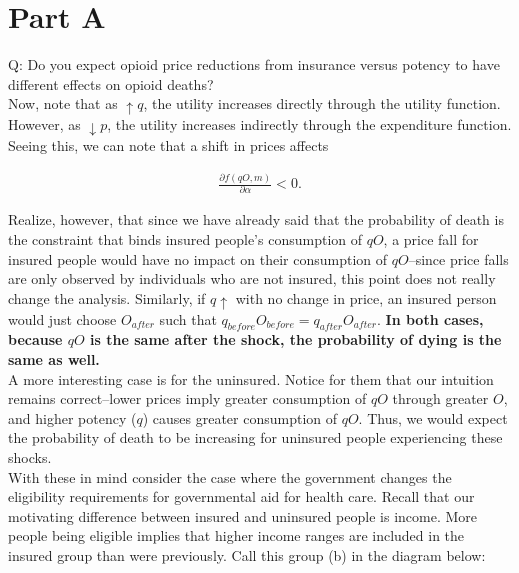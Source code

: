\documentclass{article}
\begin{document}
\section*{Part A}
Q: Do you expect opioid price reductions from insurance versus potency to have different effects on opioid deaths?
\\

Now, note that as $\uparrow q$, the utility increases directly through the  utility function. However, as $\downarrow p$, the utility increases indirectly through the expenditure function. Seeing this, we can note that a shift in prices affects \par

\begin{align*}
\frac{\partial f(qO,m)}{\partial \alpha} <0.
\end{align*}

Realize, however, that since we have already said that the probability of death is the constraint that binds insured people's consumption of $qO$, a price fall for insured people would have no impact on their consumption of $qO$--since price falls are only observed by individuals who are not insured, this point does not really change the analysis. Similarly, if $q \uparrow$ with no change in price, an insured person would just choose $O_{after}$ such that $q_{before}O_{before}=q_{after}O_{after}$. \textbf{In both cases, because $qO$ is the same after the shock, the probability of dying is the same as well.}\\

A more interesting case is for the uninsured. Notice for them that our intuition remains correct--lower prices imply greater consumption of $qO$ through greater $O$, and higher potency ($q$) causes greater consumption of $qO$. Thus, we would expect the probability of death to be increasing for uninsured people experiencing these shocks.\\

With these in mind consider the case where the government changes the eligibility requirements for governmental aid for health care. Recall that our motivating difference between insured and uninsured people is income. More people being eligible implies that higher income ranges are included in the insured group than were previously. Call this group (b) in the diagram below:


\vspace{.2in}
\end{document}

